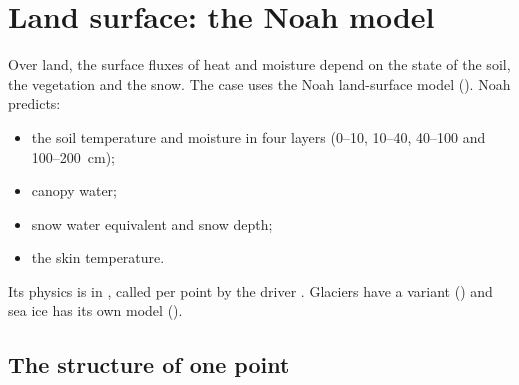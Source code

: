 \chapter{Land surface: the Noah model}\label{ch:lsm}

Over land, the surface fluxes of heat and moisture depend on the state of the soil, the vegetation and the snow. The
case uses the Noah land-surface model \citep{chen2001,ek2003} (). Noah predicts:
\begin{itemize}
  \item the soil temperature and moisture in four layers (0--10, 10--40, 40--100 and 100--200~cm);
  \item canopy water;
  \item snow water equivalent and snow depth;
  \item the skin temperature.
\end{itemize}
Its physics is in , called per point by the driver
. Glaciers have a variant () and sea ice has
its own model ().

\section{The structure of one point}

